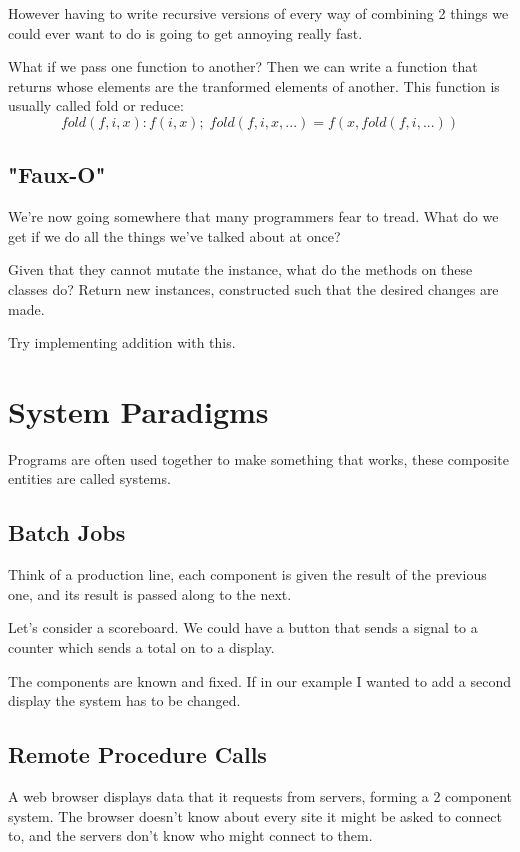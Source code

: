 \documentclass{article}
\begin{document}
However having to write recursive versions of every way of combining 2 things
we could ever want to do is going to get annoying really fast.

What if we pass one function to another?
Then we can write a function that returns  whose elements are the
tranformed elements of another.
This function is usually called fold or reduce:
\begin{displaymath}
fold(f, i, x): f(i, x) ;\; fold(f, i, x, ...) = f(x, fold(f, i, ...))
\end{displaymath}

\subsection{"Faux-O"}
We're now going somewhere that many programmers fear to tread.
What do we get if we do all the things we've talked about at once?

Given that they cannot mutate the instance, what do the methods on these
classes do?
Return new instances, constructed such that the desired changes are made.

Try implementing addition with this.

\section{System Paradigms}
Programs are often used together to make something that works, these composite
entities are called systems.

\subsection{Batch Jobs}
Think of a production line, each component is given the result of the previous
one, and its result is passed along to the next.

Let's consider a scoreboard.
We could have a button that sends a signal to a counter which sends a total on
to a display.

The components are known and fixed.
If in our example I wanted to add a second display the system has to be
changed.

\subsection{Remote Procedure Calls}
A web browser displays data that it requests from servers, forming a 2
component system. The browser doesn't know about every site it might be asked
to connect to, and the servers don't know who might connect to them.
\end{document}
